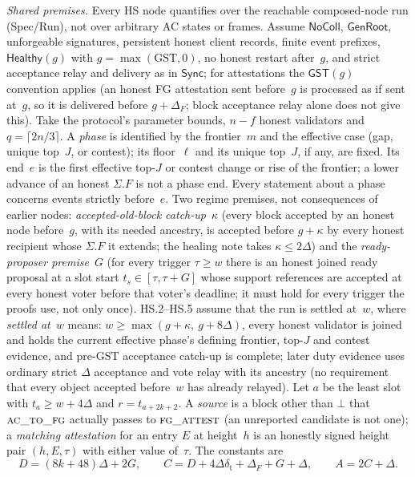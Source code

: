 \documentclass{article}
\newcommand{\fname}[1]{\text{\textsc{#1}}}
\begin{document}
\emph{Shared premises.}  Every HS node quantifies over the reachable
composed-node run (Spec/Run), not over arbitrary AC states or frames.  Assume
$\mathsf{NoColl}$, $\mathsf{GenRoot}$, unforgeable signatures, persistent honest client records,
finite event prefixes, $\mathsf{Healthy}(g)$ with
$g=\max(\mathrm{GST},0)$, no honest restart after~$g$, and strict acceptance
relay and delivery as in $\mathsf{Sync}$; for attestations the $\mathsf{GST}(g)$
convention applies (an honest FG attestation sent before~$g$ is processed as if sent
at~$g$, so it is delivered before $g+\Delta_F$; block acceptance relay alone
does not give this).  Take the protocol's parameter bounds, $n-f$ honest
validators and $q=\lceil 2n/3\rceil$.  A \emph{phase} is identified by the
frontier~$m$ and the effective case (gap, unique top~$J$, or contest); its
floor~$\ell$ and its unique top~$J$, if any, are fixed.  Its end~$e$ is the
first effective top-$J$ or contest change or rise of the frontier; a lower
advance of an honest $\Sigma.F$ is not a phase end.  Every statement about a
phase concerns events strictly before~$e$.
Two regime premises, not consequences of earlier nodes:
\emph{accepted-old-block catch-up}~$\kappa$ (every block accepted by an
honest node before~$g$, with its needed ancestry, is accepted before
$g+\kappa$ by every honest recipient whose $\Sigma.F$ it extends; the healing note
takes $\kappa\leq2\Delta$) and the \emph{ready-proposer premise}~$G$ (for every
trigger $\tau\geq w$ there is an honest joined ready proposal at a slot start
$t_s\in[\tau,\tau+G]$ whose support references are accepted at every honest
voter before that voter's deadline; it must hold for every trigger the proofs
use, not only once).
HS.2--HS.5 assume that the run is settled at~$w$, where \emph{settled
at~$w$} means: $w\geq\max(g+\kappa,\ g+8\Delta)$, every honest
validator is joined and holds the current effective phase's defining
frontier, top-$J$ and contest evidence, and pre-GST acceptance catch-up is
complete; later duty evidence uses ordinary strict $\Delta$ acceptance and
vote relay with its ancestry (no requirement that every object accepted
before~$w$ has already relayed).  Let $a$ be the least slot with
$t_a\geq w+4\Delta$ and $r=t_{a+2k+2}$.  A \emph{source} is a block other than
$\bot$ that $\fname{ac\_to\_fg}$ actually passes to $\fname{fg\_attest}$ (an
unreported candidate is not one); a \emph{matching attestation} for an entry $E$ at
height~$h$ is an honestly signed height pair $(h,E,\tau)$ with either
value of~$\tau$.  The constants are
\[
D=(8k+48)\Delta+2G,\qquad C=D+4\Delta\delta_{\mathrm t}+\Delta_F+G+\Delta,\qquad
A=2C+\Delta .
\]
\end{document}

